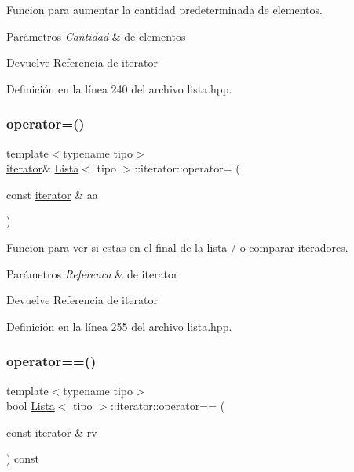 Funcion para aumentar la cantidad predeterminada de elementos. 


\begin{DoxyParams}{Parámetros}
{\em Cantidad} & de elementos \\
\hline
\end{DoxyParams}
\begin{DoxyReturn}{Devuelve}
Referencia de iterator 
\end{DoxyReturn}


Definición en la línea 240 del archivo lista.\+hpp.

\mbox{\label{classLista_1_1iterator_a602f51e54500d6027158a48a8495826a}} 
\subsubsection{\texorpdfstring{operator=()}{operator=()}}
{\footnotesize\ttfamily template$<$typename tipo$>$ \\
\hyperlink{classLista_1_1iterator}{iterator}\& \hyperlink{classLista}{Lista}$<$ tipo $>$\+::iterator\+::operator= (\begin{DoxyParamCaption}\item[{const \hyperlink{classLista_1_1iterator}{iterator} \&}]{aa }\end{DoxyParamCaption})\hspace{0.3cm}{\ttfamily [inline]}}



Funcion para ver si estas en el final de la lista / o comparar iteradores. 


\begin{DoxyParams}{Parámetros}
{\em Referenca} & de iterator \\
\hline
\end{DoxyParams}
\begin{DoxyReturn}{Devuelve}
Referencia de iterator 
\end{DoxyReturn}


Definición en la línea 255 del archivo lista.\+hpp.

\mbox{\label{classLista_1_1iterator_abb50011145596234ea6ac6d1bd5fe920}} 
\subsubsection{\texorpdfstring{operator==()}{operator==()}}
{\footnotesize\ttfamily template$<$typename tipo$>$ \\
bool \hyperlink{classLista}{Lista}$<$ tipo $>$\+::iterator\+::operator== (\begin{DoxyParamCaption}\item[{const \hyperlink{classLista_1_1iterator}{iterator} \&}]{rv }\end{DoxyParamCaption}) const\hspace{0.3cm}{\ttfamily [inline]}}



